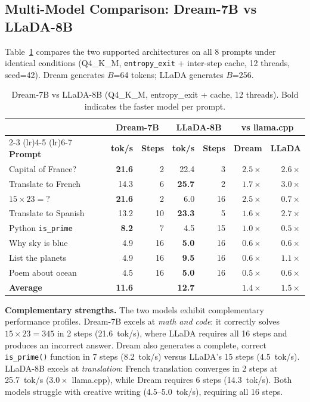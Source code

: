 \documentclass[11pt]{article}
\begin{document}
\subsection{Multi-Model Comparison: Dream-7B vs LLaDA-8B}
\label{sec:multimodel}

Table~\ref{tab:multimodel} compares the two supported architectures on all 8 prompts
under identical conditions (Q4\_K\_M, \texttt{entropy\_exit} + inter-step cache, 12
threads, seed=42). Dream generates $B$=64 tokens; LLaDA generates $B$=256.

\begin{table}[h]
\centering
\caption{Dream-7B vs LLaDA-8B (Q4\_K\_M, entropy\_exit + cache, 12 threads). Bold indicates the faster model per prompt.}
\label{tab:multimodel}
\begin{tabular}{lrrrrrr}
\toprule
 & \multicolumn{2}{c}{\textbf{Dream-7B}} & \multicolumn{2}{c}{\textbf{LLaDA-8B}} & \multicolumn{2}{c}{\textbf{vs llama.cpp}} \\
\cmidrule(lr){2-3} \cmidrule(lr){4-5} \cmidrule(lr){6-7}
\textbf{Prompt} & \textbf{tok/s} & \textbf{Steps} & \textbf{tok/s} & \textbf{Steps} & \textbf{Dream} & \textbf{LLaDA} \\
\midrule
Capital of France?   & \textbf{21.6} & 2  & 22.4 & 3  & $2.5\times$ & $2.6\times$ \\
Translate to French  & 14.3 & 6  & \textbf{25.7} & 2  & $1.7\times$ & $3.0\times$ \\
$15 \times 23 = ?$   & \textbf{21.6} & 2  & 6.0  & 16 & $2.5\times$ & $0.7\times$ \\
Translate to Spanish & 13.2 & 10 & \textbf{23.3} & 5  & $1.6\times$ & $2.7\times$ \\
Python \texttt{is\_prime} & \textbf{8.2} & 7 & 4.5 & 15 & $1.0\times$ & $0.5\times$ \\
Why sky is blue      & 4.9  & 16 & \textbf{5.0}  & 16 & $0.6\times$ & $0.6\times$ \\
List the planets     & 4.9  & 16 & \textbf{9.5}  & 16 & $0.6\times$ & $1.1\times$ \\
Poem about ocean     & 4.5  & 16 & \textbf{5.0}  & 16 & $0.5\times$ & $0.6\times$ \\
\midrule
\textbf{Average}     & \textbf{11.6} & & \textbf{12.7} & & $1.4\times$ & $1.5\times$ \\
\bottomrule
\end{tabular}
\end{table}

\textbf{Complementary strengths.} The two models exhibit complementary performance
profiles. Dream-7B excels at \emph{math and code}: it correctly solves $15 \times 23 = 345$
in 2 steps (21.6~tok/s), where LLaDA requires all 16 steps and produces an incorrect
answer. Dream also generates a complete, correct \texttt{is\_prime()} function in 7
steps (8.2~tok/s) versus LLaDA's 15 steps (4.5~tok/s). LLaDA-8B excels at
\emph{translation}: French translation converges in 2 steps at 25.7~tok/s ($3.0\times$
llama.cpp), while Dream requires 6 steps (14.3~tok/s). Both models struggle with
creative writing (4.5--5.0~tok/s), requiring all 16 steps.
\end{document}
